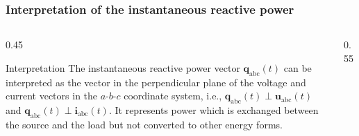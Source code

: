 \begin{frame}
    \frametitle{Interpretation of the instantaneous reactive power}
    \begin{columns}
        \begin{column}{0.45\textwidth}
            \begin{varblock}{Interpretation}
                The instantaneous reactive power vector $\bm{q}_{\mathrm{abc}}(t)$ can be interpreted as the vector in the perpendicular plane of the voltage and current vectors in the $a$-$b$-$c$ coordinate system, i.e., $\bm{q}_{\mathrm{abc}}(t)\perp\bm{u}_{\mathrm{abc}}(t)$ and $\bm{q}_{\mathrm{abc}}(t)\perp\bm{i}_{\mathrm{abc}}(t)$. It represents power which is exchanged between the source and the load but not converted to other energy forms.
            \end{varblock}
        \end{column}
        \begin{column}{0.55\textwidth}
            \begin{figure}
                \centering
\end{figure}
\end{column}
\end{columns}
\end{frame}
